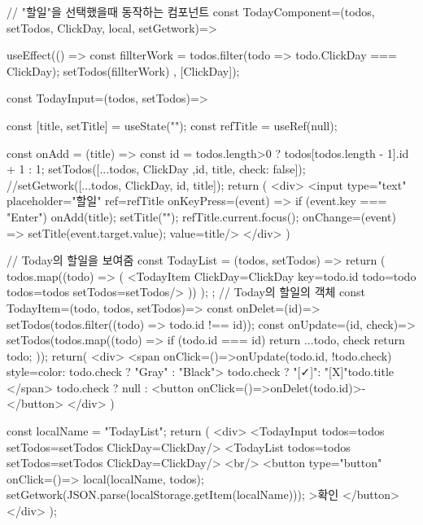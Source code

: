 // "할일"을 선택했을때 동작하는 컴포넌트
const TodayComponent=({todos, setTodos, ClickDay, local, setGetwork})=>{

    useEffect(() => {
        const fillterWork = todos.filter(todo => todo.ClickDay === ClickDay);
        setTodos(fillterWork)
    }, [ClickDay]);

    const TodayInput=({todos, setTodos})=> {
        const [title, setTitle] = useState("");
        const refTitle = useRef(null);

        const onAdd = (title) => {
            const id = todos.length>0 ? todos[todos.length - 1].id + 1 : 1;
            setTodos([...todos, {  ClickDay ,id, title, check: false}]);
            //setGetwork([...todos, {ClickDay, id, title}]);
        }
        return (
            <div>
                <input type={"text"} placeholder={"할일"} ref={refTitle} onKeyPress={(event) => {
                    if (event.key === "Enter") {
                        onAdd(title);
                        setTitle("");
                        refTitle.current.focus();
                    }
                }} onChange={(event) => {
                    setTitle(event.target.value);
                }} value={title}/>
            </div>
        )
    }

    // Today의 할일을 보여줌
    const TodayList = ({todos, setTodos}) => {
        return (
            todos.map((todo) => (
                <TodayItem ClickDay={ClickDay} key={todo.id} todo={todo} todos={todos} setTodos={setTodos}/>
            ))
        );
    };
// Today의 할일의 객체
    const TodayItem=({todo, todos, setTodos})=>{
        const onDelet=(id)=>{
            setTodos(todos.filter((todo) => todo.id !== id));}
        const onUpdate=(id, check)=>{
            setTodos(todos.map((todo) => {
                if (todo.id === id) return {...todo, check}
                return todo;
            }));
        }
        return(
            <div>
                <span onClick={()=>onUpdate(todo.id, !todo.check)} style={{color: todo.check ? "Gray" : "Black"}}>
                    {todo.check ? "[✓]": "[X]"}{todo.title}
                </span>
                {todo.check ? null : <button onClick={()=>onDelet(todo.id)}>-</button>}
            </div>
        )
    }


    const localName = "TodayList";
    return (
        <div>
            <TodayInput todos={todos} setTodos={setTodos} ClickDay={ClickDay}/>
            <TodayList todos={todos} setTodos={setTodos} ClickDay={ClickDay}/>
            <br/>
            <button type={"button"} onClick={()=> {
                local(localName, todos);
                setGetwork(JSON.parse(localStorage.getItem(localName)));
            }
            }>확인
            </button>
        </div>
    );
}



